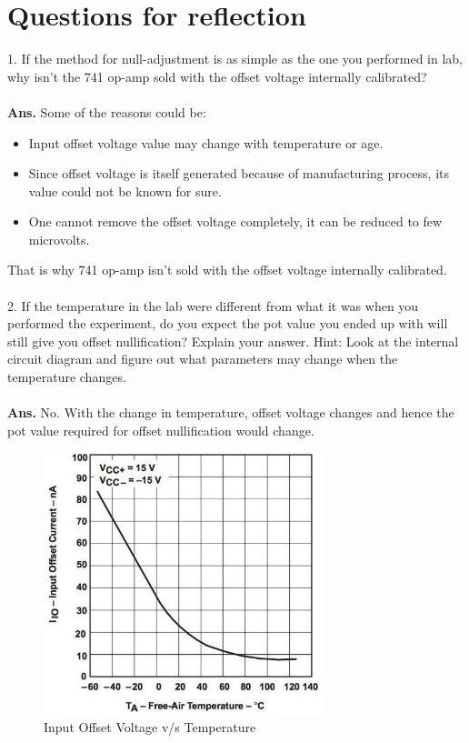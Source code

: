 \documentclass[12pt]{article}
\begin{document}
\section{Questions for reflection}

1. If the method for null-adjustment is as simple as the one you performed in lab, why isn't the 741 op-amp sold with the offset voltage internally calibrated?\\
\\
\textbf{Ans.} Some of the reasons could be:
    \begin{itemize}
        \item Input offset voltage value may change with temperature or age.
        \item Since offset voltage is itself generated because of manufacturing process, its value could not be known for sure.
        \item One cannot remove the offset voltage completely, it can be reduced to few microvolts.
    \end{itemize}
    That is why 741 op-amp isn't sold with the offset voltage internally calibrated.
\\\\
2. If the temperature in the lab were different from what it was when you performed the experiment, do you expect the pot value you ended up with will still give you offset nullification? Explain your answer. Hint: Look at the internal circuit diagram and figure out what parameters may change when the temperature changes.\\
\\
\textbf{Ans.}  No. With the change in temperature, offset voltage changes and hence the pot value required for offset nullification would change.
        \begin{figure}[H]
            \centering
            \includegraphics[width = 0.5\linewidth, height = 3in]{op.jpg}
            \caption{Input Offset Voltage v/s Temperature}
        \end{figure}
        
\end{document}
